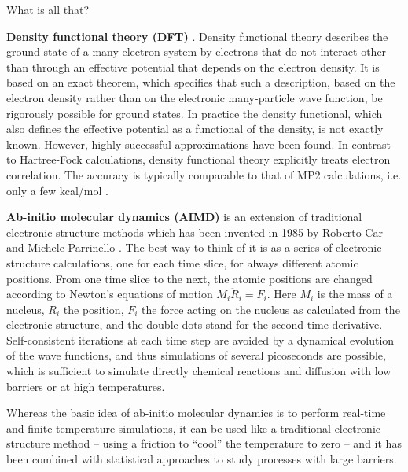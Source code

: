 \documentclass[final,12pt,makeidx,DIV=calc]{article}
\begin{document}
What is all that?

{\bf Density functional theory (DFT)}
\cite{hohenberg64_pr136_864,kohn65_pr140_1133}. Density functional
theory describes the ground state of a many-electron system by electrons that
do not interact other than through an effective potential that depends on the
electron density. It is based on an exact theorem, which specifies that such a
description, based on the electron density rather than on the electronic
many-particle wave function, be rigorously possible for ground states. In
practice the density functional, which also defines the effective potential as
a functional of the density, is not exactly known. However, highly successful
approximations have been found. In contrast to Hartree-Fock calculations,
density functional theory explicitly treats electron correlation. The accuracy
is typically comparable to that of MP2 calculations, i.e. only a few kcal/mol
\cite{becke92_jcp97_9173,dickson93_jcp99_3898}.

{\bf Ab-initio molecular dynamics (AIMD)}
\cite{car85_prl55_2471,car89_bookchapter_455,pastore91_pra44_6334} is an
extension of traditional electronic structure methods which has been invented
in 1985 by Roberto Car and Michele Parrinello \cite{car85_prl55_2471}.  The
best way to think of it is as a series of electronic structure calculations,
one for each time slice, for always different atomic positions. From one time
slice to the next, the atomic positions are changed according to Newton's
equations of motion $M_i\ddot R_i=F_i$.  Here $M_i$ is the mass of a nucleus,
$R_i$ the position, $F_i$ the force acting on the nucleus as calculated from
the electronic structure, and the double-dots stand for the second time
derivative.  Self-consistent iterations at each time step are avoided by a
dynamical evolution of the wave functions, and thus simulations of several
picoseconds are possible, which is sufficient to simulate directly chemical
reactions and diffusion with low barriers or at high temperatures.

Whereas the basic idea of ab-initio molecular dynamics is to perform
real-time and finite temperature simulations, it can be used like a
traditional electronic structure method -- using a friction to
``cool'' the temperature to zero -- and it has been combined
with statistical approaches to study processes with large barriers.
\end{document}
